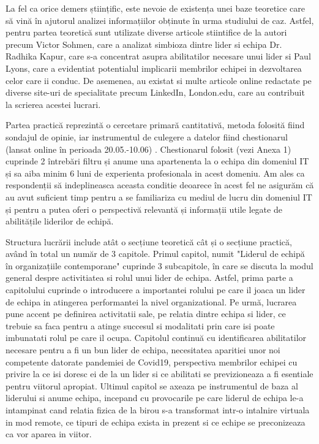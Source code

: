 \documentclass[a4paper, 12pt]{article}
\begin{document}
	\quad La fel ca orice demers științific, este nevoie de existența unei baze teoretice care să vină în ajutorul analizei informațiilor obținute în urma studiului de caz. Astfel, pentru partea teoretică sunt utilizate diverse articole stiintifice de la autori precum Victor Sohmen, care a analizat simbioza dintre lider si echipa Dr. Radhika Kapur, care s-a concentrat asupra abilitatilor necesare unui lider si Paul Lyons, care a evidentiat potentialul implicarii membrilor echipei in dezvoltarea celor care ii conduc. De asemenea, au existat si multe articole online redactate pe diverse site-uri de specialitate precum LinkedIn, London.edu, care au contribuit la scrierea acestei lucrari.

	\quad Partea practică reprezintă o cercetare primară cantitativă, metoda folosită fiind sondajul de opinie, iar instrumentul de culegere a datelor fiind chestionarul (lansat online în perioada 20.05.-10.06) . Chestionarul folosit (vezi Anexa 1) cuprinde 2 întrebări filtru și anume una apartenenta la o echipa din domeniul IT și sa aiba minim 6 luni de experienta profesionala in acest domeniu. Am ales ca respondenții să indeplineasca aceasta conditie deoarece în acest fel ne asigurăm că au avut suficient timp pentru a se familiariza cu mediul de lucru din domeniul IT și pentru a putea oferi o perspectivă relevantă și informații utile legate de abilitățile liderilor de echipă.

	\quad Structura lucrării include atât o secțiune teoretică cât și o secțiune practică, având în total un număr de 3 capitole. Primul capitol, numit "Liderul de echipă în organizațiile contemporane" cuprinde 3 subcapitole, în care se discuta la modul general despre activitiatea si rolul unui lider de echipa. Astfel, prima parte a capitolului cuprinde o introducere a importantei rolului pe care il joaca un lider de echipa in atingerea performantei la nivel organizational. Pe urmă, lucrarea pune accent pe definirea activitatii sale, pe relatia dintre echipa si lider, ce trebuie sa faca pentru a atinge succesul si modalitati prin care isi poate imbunatati rolul pe care il ocupa. Capitolul continuă cu identificarea abilitatilor necesare pentru a fi un bun lider de echipa, necesitatea aparitiei unor noi competente datorate pandemiei de Covid19, perspectiva membrilor echipei cu privire la ce isi doresc ei de la un lider si ce abilitati se previzioneaza a fi esentiale pentru viitorul apropiat. Ultimul capitol se axeaza pe instrumentul de baza al liderului si anume echipa, incepand cu provocarile pe care liderul de echipa le-a intampinat cand relatia fizica de la birou s-a transformat intr-o intalnire virtuala in mod remote, ce tipuri de echipa exista in prezent si ce echipe se preconizeaza ca vor aparea in viitor.
\end{document}
